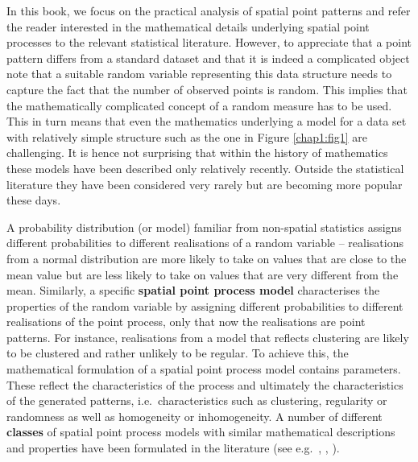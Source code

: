 In this book, we focus on the practical analysis of spatial point patterns and refer the reader interested in the mathematical  details underlying spatial point processes to the relevant statistical literature.  However, to appreciate that a point pattern differs from a standard dataset and that it is indeed a complicated object note that a suitable random variable representing this data structure needs to capture the fact that the number of observed points is random. This implies that the mathematically complicated concept of a random measure has to be used. This in turn means that even the mathematics underlying a model for a data set with relatively simple structure such as the one in Figure \ref{chap1:fig1} are challenging. It is hence not surprising that within the history of mathematics these models have been described only relatively recently. Outside the statistical literature they have been considered very rarely but are becoming more popular these days.

A probability distribution (or model) familiar from non-spatial statistics assigns different probabilities to different realisations of a random variable -- realisations from a normal distribution are more likely to take on values that are close to the mean value but are less likely to take on values that are very different from the mean.  
Similarly, a specific \textbf{spatial point process model} characterises the properties of the random variable by assigning different probabilities to different realisations of the point process, only that now the realisations are point patterns. For instance, realisations from a model that reflects clustering are likely to be clustered and rather unlikely to be regular.  To achieve this, the mathematical formulation of a spatial point process model contains parameters.  These reflect the characteristics of the process and ultimately the characteristics of the generated patterns, i.e.\ characteristics such as clustering, regularity or randomness as well as homogeneity or inhomogeneity.  A number of different \textbf{classes} of spatial point process models with similar mathematical descriptions and properties have been formulated in the literature (see e.g.\ \cite{lieshout:00}, \cite{moeller:03}, \cite{stoystoy:94}).





